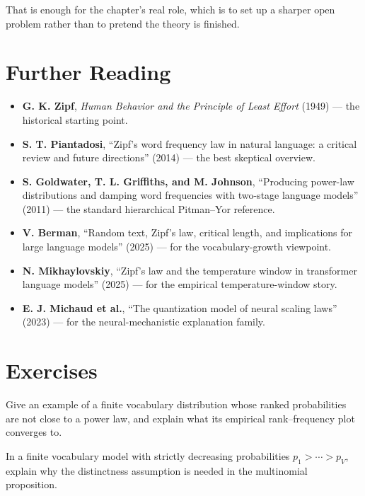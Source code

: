 That is enough for the chapter's real role, which is to set up a sharper open problem rather than to pretend the theory is finished.

\section*{Further Reading}

\begin{itemize}
  \item \textbf{G. K. Zipf}, \emph{Human Behavior and the Principle of Least Effort} (1949) \cite{Zipf1949} --- the historical starting point.
  \item \textbf{S. T. Piantadosi}, ``Zipf's word frequency law in natural language: a critical review and future directions'' (2014) \cite{Piantadosi2014} --- the best skeptical overview.
  \item \textbf{S. Goldwater, T. L. Griffiths, and M. Johnson}, ``Producing power-law distributions and damping word frequencies with two-stage language models'' (2011) \cite{GoldwaterGriffithsJohnson2011} --- the standard hierarchical Pitman--Yor reference.
  \item \textbf{V. Berman}, ``Random text, Zipf's law, critical length, and implications for large language models'' (2025) \cite{Berman2025} --- for the vocabulary-growth viewpoint.
  \item \textbf{N. Mikhaylovskiy}, ``Zipf's law and the temperature window in transformer language models'' (2025) \cite{Mikhaylovskiy2025b} --- for the empirical temperature-window story.
  \item \textbf{E. J. Michaud et al.}, ``The quantization model of neural scaling laws'' (2023) \cite{MichaudEtAl2023} --- for the neural-mechanistic explanation family.
\end{itemize}

\section{Exercises}

\begin{exercise}
Give an example of a finite vocabulary distribution whose ranked probabilities are not close to a power law, and explain what its empirical rank--frequency plot converges to.
\end{exercise}

\begin{exercise}
In a finite vocabulary model with strictly decreasing probabilities $p_1>\cdots>p_V$, explain why the distinctness assumption is needed in the multinomial proposition.
\end{exercise}
